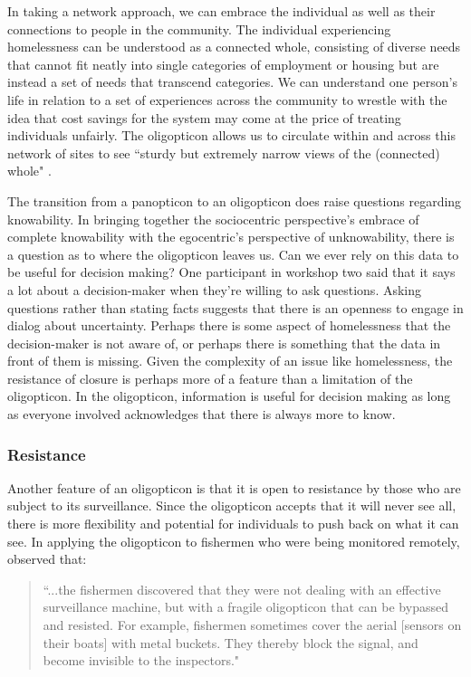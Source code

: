 In taking a network approach, we can embrace the individual as well as their connections to people in the community. The individual experiencing homelessness can be understood as a connected whole, consisting of diverse needs that cannot fit neatly into single categories of employment or housing but are instead a set of needs that transcend categories. We can understand one person's life in relation to a set of experiences across the community to wrestle with the idea that cost savings for the system may come at the price of treating individuals unfairly. The oligopticon allows us to circulate within and across this network of sites to see “sturdy but extremely narrow views of the (connected) whole" \citep{Latour2005ANT}.

The transition from a panopticon to an oligopticon does raise questions regarding knowability. In bringing together the sociocentric perspective's embrace of complete knowability with the egocentric's perspective of unknowability, there is a question as to where the oligopticon leaves us. Can we ever rely on this data to be useful for decision making? One participant in workshop two said that it says a lot about a decision-maker when they're willing to ask questions. Asking questions rather than stating facts suggests that there is an openness to engage in dialog about uncertainty. Perhaps there is some aspect of homelessness that the decision-maker is not aware of, or perhaps there is something that the data in front of them is missing. Given the complexity of an issue like homelessness, the resistance of closure is perhaps more of a feature than a limitation of the oligopticon. In the oligopticon, information is useful for decision making as long as everyone involved acknowledges that there is always more to know.

\subsubsection{Resistance}
Another feature of an oligopticon is that it is open to resistance by those who are subject to its surveillance. Since the oligopticon accepts that it will never see all, there is more flexibility and potential for individuals to push back on what it can see. In applying the oligopticon to fishermen who were being monitored remotely, \citet{Gad2009Situated} observed that:

\begin{quote}\singlespacing ``...the fishermen discovered that they were not dealing with an effective surveillance machine, but with a fragile oligopticon that can be bypassed and resisted. For example, fishermen sometimes cover the aerial [sensors on their boats] with metal buckets. They thereby block the signal, and become invisible to the inspectors." \end{quote}

